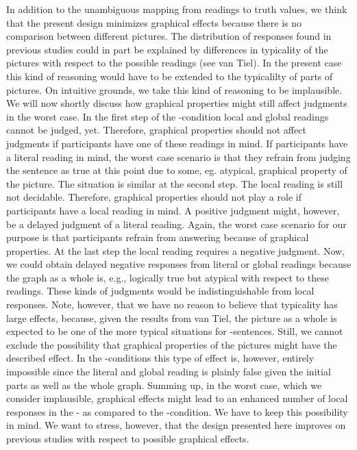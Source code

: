 \documentclass[fleqn,reqno,10pt,draft]{article}
\newcommand{\as}{\acro{as}}
\renewcommand{\es}{\acro{es}}
\begin{document}
In addition to the unambiguous mapping from readings to truth values,
we think that the present design minimizes graphical effects because
there is no comparison between different pictures. The distribution of
responses found in previous studies could in part be explained by
differences in typicality of the pictures with respect to the possible
readings (see van Tiel). In the present case this kind of reasoning
would have to be extended to the typicalilty of parts of pictures. On
intuitive grounds, we take this kind of reasoning to be
implausible. We will now shortly discuss how graphical properties
might still affect judgments in the worst case. In the first step of
the \as-condition local and global readings cannot be judged,
yet. Therefore, graphical properties should not affect judgments if
participants have one of these readings in mind. If participants have
a literal reading in mind, the worst case scenario is that they
refrain from judging the sentence as true at this point due to some,
eg. atypical, graphical property of the picture. The situation is
similar at the second step. The local reading is still not
decidable. Therefore, graphical properties should not play a role if
participants have a local reading in mind. A positive judgment might,
however, be a delayed judgment of a literal reading. Again, the worst
case scenario for our purpose is that participants refrain from
answering because of graphical properties. At the last step the local
reading requires a negative judgment. Now, we could obtain delayed
negative responses from literal or global readings because the graph
as a whole is, e.g., logically true but atypical with respect to these
readings. These kinds of judgments would be indistinguishable from
local responses. Note, however, that we have no reason to believe that
typicality has large effects, because, given the results from van
Tiel, the picture as a whole is expected to be one of the more typical
situations for \as-sentences. Still, we cannot exclude the possibility
that graphical properties of the pictures might have the described
effect. In the \es-conditions this type of effect is, however, entirely
impossible since the literal and global reading is plainly false given
the initial parts as well as the whole graph. Summing up, in the worst
case, which we consider implausible, graphical effects might lead to
an enhanced number of local responses in the \as- as compared to the
\es-condition. We have to keep this possibility in mind. We want to
stress, however, that the design presented here improves on previous
studies with respect to possible graphical effects.
\end{document}
